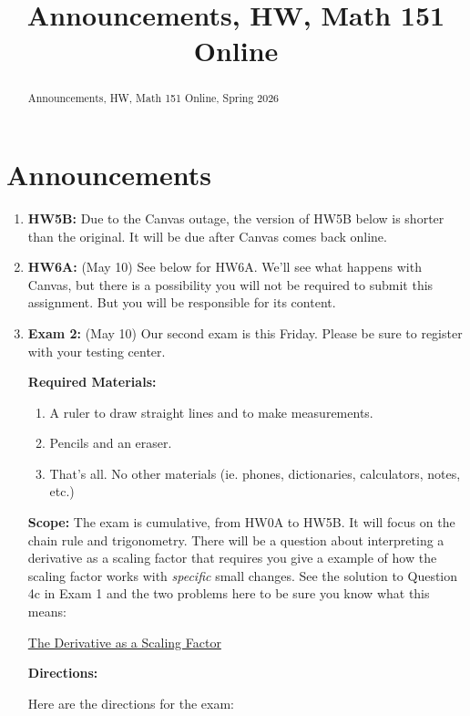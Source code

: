 \documentclass{ximera}
\title{Announcements, HW, Math 151 Online}
\begin{document}
\begin{abstract}
Announcements, HW, Math 151 Online, Spring 2026
\end{abstract}
\maketitle


\section{Announcements}
\begin{enumerate}
\item {\bf HW5B:} Due to the Canvas outage, the version of HW5B below is shorter than the original. It will be due after Canvas comes back online.

\item {\bf HW6A:} (May 10) See below for HW6A. We'll see what happens with Canvas, but there is a possibility you will not be required to submit this assignment. But you will be responsible for its content.

\item {\bf Exam 2:} (May 10) Our second exam is this Friday. Please be sure to register with your testing center.

{\bf Required Materials:}
\begin{enumerate}
\item A ruler to draw straight lines and to make measurements.

\item Pencils and an eraser.

\item That's all. No other materials (ie. phones, dictionaries, calculators, notes, etc.)
\end{enumerate}

{\bf Scope:} The exam is cumulative, from HW0A to HW5B. It will focus on the chain rule and trigonometry. There will be a question about interpreting a derivative as a scaling factor that requires you give a example of how the scaling factor works with \emph{specific} small changes. See the solution to Question 4c in Exam 1 and the two problems here to be sure you know what this means:

\href{https://ximera.osu.edu/calcone/Calculus1/ScalingFactorsSummary/ScalingFactorsSummary}{The Derivative as a Scaling Factor}

{\bf Directions:}

Here are the directions for the exam:


\end{enumerate}
\end{document}
